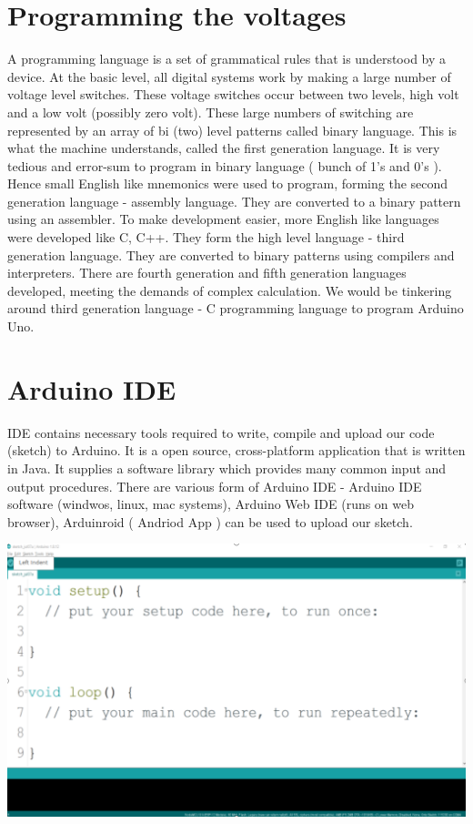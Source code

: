 \section{Programming the voltages}
\par A programming language is a set of grammatical rules that is understood by a device. At the basic level, all digital systems work by making a large number of voltage level switches. These voltage switches occur between two levels, high volt and a low volt (possibly zero volt). These large numbers of switching are represented by an array of bi (two) level patterns called binary language. This is what the machine understands, called the first generation language. It is very tedious and error-sum to program in binary language ( bunch of 1’s and 0’s ). Hence small English like mnemonics were used to program, forming the second generation language - assembly language. They are converted to a binary pattern using an assembler. To make development easier, more English like languages were developed like C, C++. They form the high level language - third generation language. They are converted to binary patterns using compilers and interpreters. There are fourth generation and fifth generation languages developed, meeting the demands of complex calculation. We would be tinkering around third generation language - C programming language to program Arduino Uno.

\section{Arduino IDE}


\par \ac{IDE} contains necessary tools required to write, compile and upload our code (sketch) to Arduino. It is a open source, cross-platform application that is written in Java. It supplies a software library which provides many common input and output procedures. There are various form of Arduino \ac{IDE} - Arduino \ac{IDE} software (windwos, linux, mac systems), Arduino Web \ac{IDE} (runs on web browser), Arduinroid ( Andriod App ) can be used to upload our sketch.

\begin{marginfigure}
    \vspace{-4cm} \includegraphics{Images/Programing_Arduino/IDE_interface.png}
\end{marginfigure}

